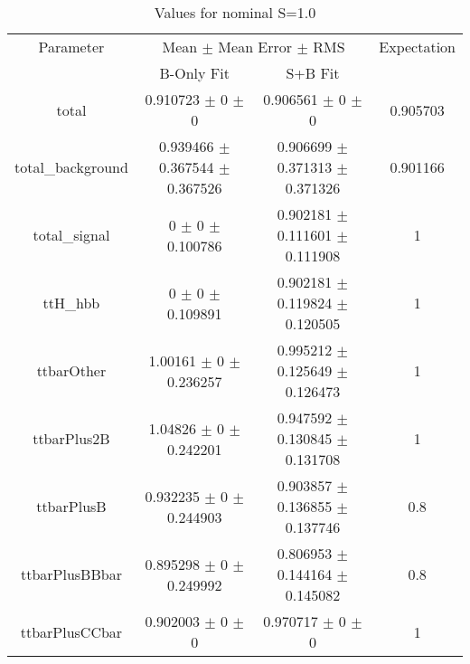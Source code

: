 \begin{table}
\centering
\caption{Values for nominal S=1.0}
\begin{tabular}{cccc}
\toprule
Parameter & \multicolumn{2}{c}{Mean $\pm$ Mean Error $\pm$ RMS} & Expectation\\
 & B-Only Fit & S+B Fit & \\
\midrule
total & \num{0.910723} $\pm$ \num{0} $\pm$ \num{0} & \num{0.906561} $\pm$ \num{0} $\pm$ \num{0} & \num{0.905703}\\
total\_background & \num{0.939466} $\pm$ \num{0.367544} $\pm$ \num{0.367526} & \num{0.906699} $\pm$ \num{0.371313} $\pm$ \num{0.371326} & \num{0.901166}\\
total\_signal & \num{0} $\pm$ \num{0} $\pm$ \num{0.100786} & \num{0.902181} $\pm$ \num{0.111601} $\pm$ \num{0.111908} & \num{1}\\
ttH\_hbb & \num{0} $\pm$ \num{0} $\pm$ \num{0.109891} & \num{0.902181} $\pm$ \num{0.119824} $\pm$ \num{0.120505} & \num{1}\\
ttbarOther & \num{1.00161} $\pm$ \num{0} $\pm$ \num{0.236257} & \num{0.995212} $\pm$ \num{0.125649} $\pm$ \num{0.126473} & \num{1}\\
ttbarPlus2B & \num{1.04826} $\pm$ \num{0} $\pm$ \num{0.242201} & \num{0.947592} $\pm$ \num{0.130845} $\pm$ \num{0.131708} & \num{1}\\
ttbarPlusB & \num{0.932235} $\pm$ \num{0} $\pm$ \num{0.244903} & \num{0.903857} $\pm$ \num{0.136855} $\pm$ \num{0.137746} & \num{0.8}\\
ttbarPlusBBbar & \num{0.895298} $\pm$ \num{0} $\pm$ \num{0.249992} & \num{0.806953} $\pm$ \num{0.144164} $\pm$ \num{0.145082} & \num{0.8}\\
ttbarPlusCCbar & \num{0.902003} $\pm$ \num{0} $\pm$ \num{0} & \num{0.970717} $\pm$ \num{0} $\pm$ \num{0} & \num{1}\\
\bottomrule
\end{tabular}
\end{table}